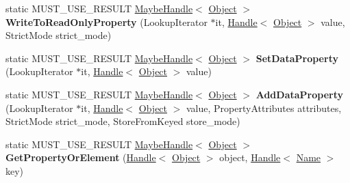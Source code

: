 \begin{DoxyCompactItemize}
\item 
\hypertarget{classv8_1_1internal_1_1_object_a600f39975d39c6476cf1cfd8dd29cd50}{}static M\+U\+S\+T\+\_\+\+U\+S\+E\+\_\+\+R\+E\+S\+U\+L\+T \hyperlink{classv8_1_1internal_1_1_maybe_handle}{Maybe\+Handle}$<$ \hyperlink{classv8_1_1internal_1_1_object}{Object} $>$ {\bfseries Write\+To\+Read\+Only\+Property} (Lookup\+Iterator $\ast$it, \hyperlink{classv8_1_1internal_1_1_handle}{Handle}$<$ \hyperlink{classv8_1_1internal_1_1_object}{Object} $>$ value, Strict\+Mode strict\+\_\+mode)\label{classv8_1_1internal_1_1_object_a600f39975d39c6476cf1cfd8dd29cd50}

\item 
\hypertarget{classv8_1_1internal_1_1_object_adf0c202c5b405760f81db8e59543905c}{}static M\+U\+S\+T\+\_\+\+U\+S\+E\+\_\+\+R\+E\+S\+U\+L\+T \hyperlink{classv8_1_1internal_1_1_maybe_handle}{Maybe\+Handle}$<$ \hyperlink{classv8_1_1internal_1_1_object}{Object} $>$ {\bfseries Set\+Data\+Property} (Lookup\+Iterator $\ast$it, \hyperlink{classv8_1_1internal_1_1_handle}{Handle}$<$ \hyperlink{classv8_1_1internal_1_1_object}{Object} $>$ value)\label{classv8_1_1internal_1_1_object_adf0c202c5b405760f81db8e59543905c}

\item 
\hypertarget{classv8_1_1internal_1_1_object_a12b43b5be46b5bd9146e1a1fa965944e}{}static M\+U\+S\+T\+\_\+\+U\+S\+E\+\_\+\+R\+E\+S\+U\+L\+T \hyperlink{classv8_1_1internal_1_1_maybe_handle}{Maybe\+Handle}$<$ \hyperlink{classv8_1_1internal_1_1_object}{Object} $>$ {\bfseries Add\+Data\+Property} (Lookup\+Iterator $\ast$it, \hyperlink{classv8_1_1internal_1_1_handle}{Handle}$<$ \hyperlink{classv8_1_1internal_1_1_object}{Object} $>$ value, Property\+Attributes attributes, Strict\+Mode strict\+\_\+mode, Store\+From\+Keyed store\+\_\+mode)\label{classv8_1_1internal_1_1_object_a12b43b5be46b5bd9146e1a1fa965944e}

\item 
\hypertarget{classv8_1_1internal_1_1_object_a15e429cef03b00f23109b79739f8439b}{}static M\+U\+S\+T\+\_\+\+U\+S\+E\+\_\+\+R\+E\+S\+U\+L\+T \hyperlink{classv8_1_1internal_1_1_maybe_handle}{Maybe\+Handle}$<$ \hyperlink{classv8_1_1internal_1_1_object}{Object} $>$ {\bfseries Get\+Property\+Or\+Element} (\hyperlink{classv8_1_1internal_1_1_handle}{Handle}$<$ \hyperlink{classv8_1_1internal_1_1_object}{Object} $>$ object, \hyperlink{classv8_1_1internal_1_1_handle}{Handle}$<$ \hyperlink{classv8_1_1internal_1_1_name}{Name} $>$ key)\label{classv8_1_1internal_1_1_object_a15e429cef03b00f23109b79739f8439b}


\end{DoxyCompactItemize}
